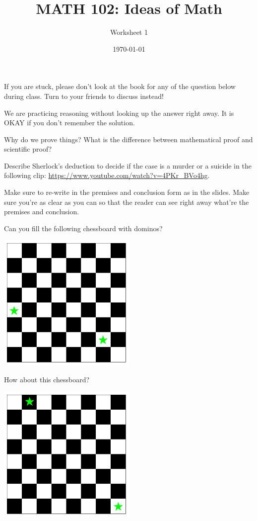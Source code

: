 \documentclass[12pt]{amsart}
\title{ MATH 102: Ideas  of Math }
\author{ Worksheet 1 }
\date{\today}
\begin{document}
\maketitle

If you are stuck, please don't look at the book for any of the question below during class.
Turn to your friends to discuss instead!

We are practicing reasoning without looking up the answer right away.
It is OKAY if you don't remember the solution.

\begin{question}
	Why do we prove things?
	What is the difference between mathematical proof and scientific proof?
\end{question}

\begin{question}
	Describe Sherlock's deduction to decide if the case is a murder or
	a suicide in the following clip:
	\url{https://www.youtube.com/watch?v=4PKr_BVo4hg}.

	Make sure to re-write in the premises and conclusion form as in the slides. Make sure you're as clear as you can so that the reader can see right away what're the premises and conclusion.
\end{question}


\begin{question}[8x8 chessboard]
	Can you fill the following chessboard with dominos?
	\begin{center}
		\includegraphics[width=0.5\textwidth]{Checker1.pdf}
	\end{center}

	How about this chessboard?
	\begin{center}
		\includegraphics[width=0.5\textwidth]{Checker2.pdf}
	\end{center}
\end{question}
\end{document}
